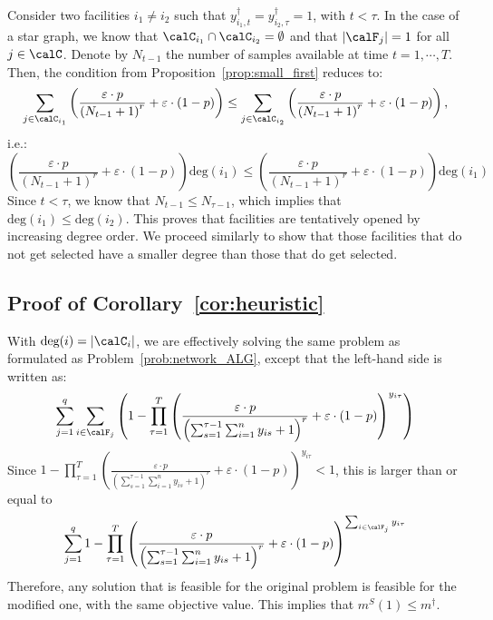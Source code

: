 \documentclass[blindrev]{informs3noheader}
\begin{document}
Consider two facilities $i_1\neq i_2$ such that $y^\dagger_{i_1,t}=y^\dagger_{i_2, \tau}=1$, with $t<\tau$. In the case of a star graph, we know that $\calC_{i_1}\cap\calC_{i_2}=\emptyset$ and that $|\calF_j|=1$ for all $j\in\calC$. Denote by $N_{t-1}$ the number of samples available at time $t=1,\cdots,T$. Then, the condition from Proposition~\ref{prop:small_first} reduces to:
$$\sum_{j \in \calC_{i_1}}\left(\frac{\varepsilon\cdot p}{\left(N_{t-1} +1\right)^r}+\varepsilon\cdot(1-p)\right)\leq\sum_{j \in \calC_{i_2}}\left(\frac{\varepsilon\cdot p}{\left(N_{t-1} +1\right)^r}+\varepsilon\cdot(1-p)\right),$$
i.e.:
$$\left(\frac{\varepsilon\cdot p}{\left(N_{t-1} +1\right)^r}+\varepsilon\cdot(1-p)\right)\text{deg}(i_1)\leq\left(\frac{\varepsilon\cdot p}{\left(N_{t-1} +1\right)^r}+\varepsilon\cdot(1-p)\right)\text{deg}(i_1)$$
Since $t<\tau$, we know that $N_{t-1}\leq N_{\tau-1}$, which implies that $\text{deg}(i_1)\leq\text{deg}(i_2)$. This proves that facilities are tentatively opened by increasing degree order. We proceed similarly to show that those facilities that do not get selected have a smaller degree than those that do get selected.
\hfill\Halmos

\subsection{Proof of Corollary~\ref{cor:heuristic}}

With $\text{deg}(i)=|\calC_i|$, we are effectively solving the same problem as formulated as Problem~\eqref{prob:network_ALG}, except that the left-hand side is written as:
\[\sum_{j=1}^q \sum_{i \in \calF_j} \left(1-\prod_{\tau=1}^T \left(\frac{\varepsilon\cdot p }{\left(\sum_{s=1}^{\tau-1} \sum_{i=1}^n y_{is} +1\right)^r}+\varepsilon\cdot(1-p)\right)^{y_{i\tau}}\right)\]
Since $1-\prod_{\tau=1}^T \left(\frac{\varepsilon\cdot p }{\left(\sum_{s=1}^{\tau-1} \sum_{i=1}^n y_{is} +1\right)^r}+\varepsilon\cdot(1-p)\right)^{y_{i\tau}}<1$, this is larger than or equal to
\begin{align*}
\sum_{j=1}^q 1-\prod_{\tau=1}^T \left(\frac{\varepsilon\cdot p }{\left(\sum_{s=1}^{\tau-1} \sum_{i=1}^n y_{is} +1\right)^r}+\varepsilon\cdot(1-p)\right)^{\sum_{i \in \calF_j} y_{i\tau}}  
\end{align*}
Therefore, any solution that is feasible for the original problem is feasible for the modified one, with the same objective value. This implies that $m^S(1)\leq m^\dagger$.
\end{document}
